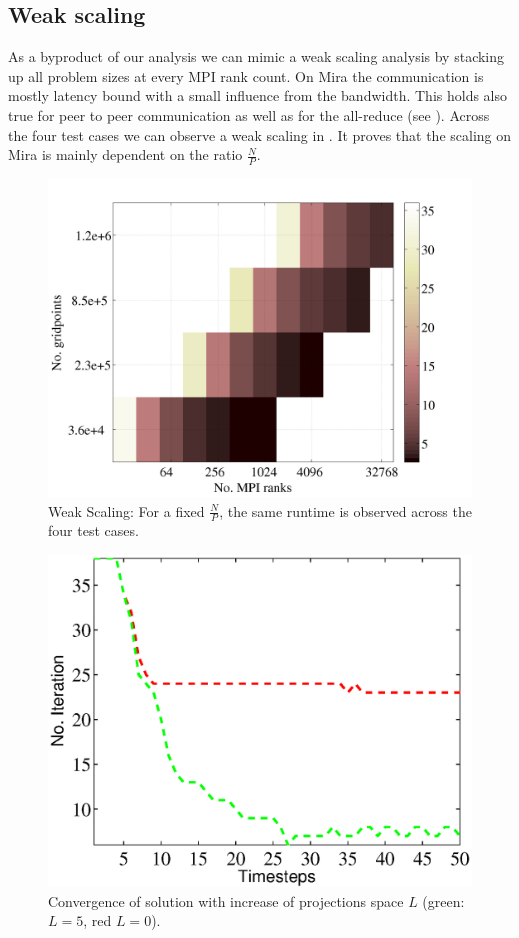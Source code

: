 \documentclass{sig-alternate}
\begin{document}
\subsection{Weak scaling}
As a byproduct of our analysis we can mimic a weak scaling analysis by stacking up 
all problem sizes at every MPI rank count. On Mira the communication is mostly 
latency bound with a small influence from the
bandwidth. This holds also true for peer to peer communication as well as for the
all-reduce (see ). Across the four test cases we can observe 
a weak scaling in . It proves that the scaling on Mira is 
mainly dependent on the ratio $\frac{N}{P}$. 
\begin{figure}
  \centering
  \includegraphics[width=\linewidth]{./figures/weak.png}
  \caption{Weak Scaling: For a fixed $\frac{N}{P}$, the same runtime is
  observed across the four test cases.}
  \label{fig:weakscaling}
\end{figure}

\begin{figure}
  \centering
  \includegraphics[width=\linewidth]{./figures/projections.eps}
  \caption{Convergence of solution with increase of projections space $L$ (green: $L=5$, red $L=0$).}
  \label{fig:projections}
\end{figure}
\end{document}
